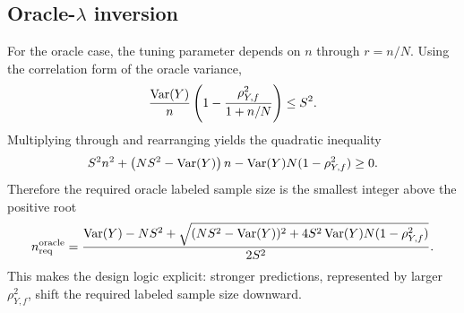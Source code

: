 \subsection{Oracle-\texorpdfstring{$\lambda$}{lambda} inversion}

For the oracle case, the tuning parameter depends on $n$ through $r=n/N$. Using the correlation form of the oracle variance,
\[
\frac{\operatorname{Var}(Y)}{n}
\left(
1-\frac{\rho_{Y,f}^2}{1+n/N}
\right)
\le S^2.
\]
Multiplying through and rearranging yields the quadratic inequality
\[
S^2 n^2
+
\left(NS^2-\operatorname{Var}(Y)\right)n
-
\operatorname{Var}(Y)N(1-\rho_{Y,f}^2)
\ge 0.
\]
Therefore the required oracle labeled sample size is the smallest integer above the positive root
\[
n_{\mathrm{req}}^{\mathrm{oracle}}
=
\frac{
\operatorname{Var}(Y)-NS^2
+
\sqrt{(NS^2-\operatorname{Var}(Y))^2+4S^2\operatorname{Var}(Y)N(1-\rho_{Y,f}^2)}
}
{2S^2}.
\]
This makes the design logic explicit: stronger predictions, represented by larger $\rho_{Y,f}^2$, shift the required labeled sample size downward.




